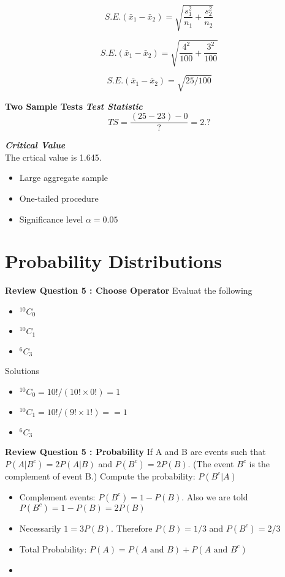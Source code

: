 \documentclass[]{report}
\begin{document}
{%

\[ S.E.(\bar{x}_1 - \bar{x}_2)  = \sqrt{\frac{s^2_1}{n_1} + \frac{s^2_2}{n_2}}\]

\[ S.E.(\bar{x}_1 - \bar{x}_2)  = \sqrt{\frac{4^2}{100} + \frac{3^2}{100}}\]

\[ S.E.(\bar{x}_1 - \bar{x}_2)  =\sqrt{ 25/100}\]



\textbf{Two Sample Tests}
\noindent \textbf{\emph{Test Statistic}}
\[TS = \frac{(25-23) - 0}{?} = 2.?\]

\noindent \textbf{\emph{Critical Value}}\\
The crtical value is 1.645.
\begin{itemize}
\item Large aggregate sample
\item One-tailed procedure
\item Significance level $\alpha=0.05$
\end{itemize}








\chapter{Probability Distributions}



\textbf{Review Question 5 : Choose Operator}
Evaluat the following
\begin{itemize}
\item $^{10}C_0$ 
\item $^{10}C_1$
\item $^6C_3$
\end{itemize}
Solutions
\begin{itemize}
\item $^{10}C_0  = 10! / (10! \times 0!) = 1$
\item $^{10}C_1 =  10! / (9! \times 1!) =  = 1$
\item $^6C_3$
\end{itemize}


\textbf{Review Question 5 :  Probability}
If A and B are events such that $P(A|B^c) = 2P(A|B)$ and $P(B^c) = 2P(B)$.
(The event $B^c$ is the complement of event B.) Compute the probability: $P(B^c|A)$ 

\begin{itemize}
\item Complement events: $P(B^c) = 1 - P(B)$. Also we are told $P(B^c) = 1-P(B)= 2P(B)$
\item Necessarily $1 = 3P(B)$. Therefore $P(B) = 1/3$ and  $P(B^c)=2/3$
\item Total Probability: $P(A) = P(A \mbox{ and } B) + P(A \mbox{ and } B^c)$
\item
\end{itemize}







}
\end{document}
